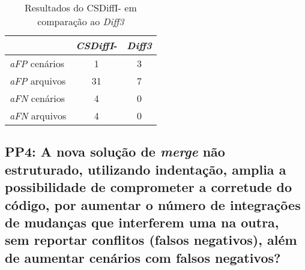 \begin{table}[ht]
	\begin{center}
		\begin{tabular}{|l|c|c|}
			\hline
			\textbf{ }          & \textbf{\emph{CSDiffI}-} & \textbf{\emph{Diff3}} \\
			\hline
			\emph{aFP} cenários & 1                 & 3                     \\
			\emph{aFP} arquivos & 31                & 7                     \\
			\emph{aFN} cenários & 4                 & 0                     \\
			\emph{aFN} arquivos & 4                 & 0                     \\
			\hline
		\end{tabular}
	\end{center}
	\caption{Resultados do CSDiffI- em comparação ao \emph{Diff3}}\label{csdiff_indentation_minus_afp_afn}
\end{table}


\subsection{PP4: A nova solução de \emph{merge} não estruturado, utilizando
	indentação, amplia a possibilidade de comprometer a corretude do código,
	por aumentar o número de integrações de mudanças que interferem uma na
	outra, sem reportar conflitos (falsos negativos), além de aumentar cenários
	com falsos negativos?}


